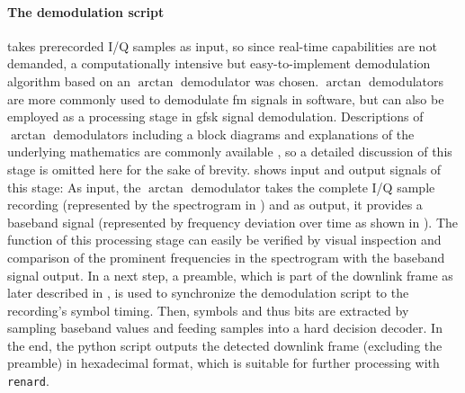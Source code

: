 \paragraph{The demodulation script} takes prerecorded I/Q samples as input, so since real-time capabilities are not demanded, a computationally intensive but easy-to-implement demodulation algorithm based on an $\arctan$ demodulator was chosen.
$\arctan$ demodulators are more commonly used to demodulate \gls{fm} signals in software, but can also be employed as a processing stage in \gls{gfsk} signal demodulation.
Descriptions of $\arctan$ demodulators including a block diagrams and explanations of the underlying mathematics are commonly available \cite{fmdemod_arctan}, so a detailed discussion of this stage is omitted here for the sake of brevity.
 shows input and output signals of this stage:
As input, the $\arctan$ demodulator takes the complete I/Q sample recording (represented by the spectrogram in ) and as output, it provides a baseband signal (represented by frequency deviation over time as shown in ).
The function of this processing stage can easily be verified by visual inspection and comparison of the prominent frequencies in the spectrogram with the baseband signal output.
In a next step, a preamble, which is part of the downlink frame as later described in , is used to synchronize the demodulation script to the recording's symbol timing.
Then, symbols and thus bits are extracted by sampling baseband values and feeding samples into a hard decision decoder.
In the end, the python script outputs the detected downlink frame (excluding the preamble) in hexadecimal format, which is suitable for further processing with \texttt{renard}.


